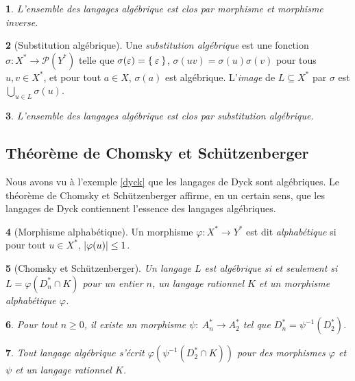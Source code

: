 \documentclass[11pt,a4paper]{article}
\theoremstyle{plain}
\newtheorem{thm}{\protect\theoremname}
\theoremstyle{definition}
\newtheorem{defn}[thm]{\protect\definitionname}
\theoremstyle{definition}
\theoremstyle{remark}
\theoremstyle{remark}
\theoremstyle{plain}
\newtheorem{lem}[thm]{\protect\lemmaname}
\theoremstyle{plain}
\newtheorem{prop}[thm]{\protect\propositionname}
\theoremstyle{plain}
\newtheorem{cor}[thm]{\protect\corollaryname}
\theoremstyle{remark}
\providecommand{\corollaryname}{Corollaire}
\providecommand{\definitionname}{Définition}
\providecommand{\lemmaname}{Lemme}
\providecommand{\propositionname}{Proposition}
\providecommand{\theoremname}{Théorème}
\begin{document}
\begin{prop}
	L'ensemble des langages algébrique est clos par morphisme et morphisme inverse.
\end{prop}

\begin{defn}[Substitution algébrique]
	Une \emph{substitution algébrique} est une fonction $\sigma:X^*\to \mathcal{P}(Y^*)$ telle que $\sigma(\varepsilon)=\Set{\varepsilon}$, $\sigma(uv)=\sigma(u)\sigma(v)$ pour tous $u,v\in X ^*$, et pour tout $a\in X$, $\sigma(a)$ est algébrique. L'\emph{image} de $L\subseteq X^*$ par $\sigma$ est $\underset{u\in L}{\bigcup}\sigma(u)$.
\end{defn}

\begin{prop}
	L'ensemble des langages algébrique est clos par substitution algébrique.
\end{prop}

\subsection{Théorème de Chomsky et Schützenberger} %

Nous avons vu à l'exemple \ref{dyck} que les langages de Dyck sont algébriques. Le théorème de Chomsky et Schützenberger affirme, en un certain sens, que les langages de Dyck contiennent l'essence des langages algébriques.

\begin{defn}[Morphisme alphabétique]
	Un morphisme $\varphi:X^*\to Y^*$ est dit \emph{alphabétique} si pour tout $u\in X^*$, $\left|\varphi(u)\right| \le 1$.
\end{defn}

\begin{thm}[Chomsky et Schützenberger]
	Un langage $L$ est algébrique si et seulement si $L=\varphi(D^*_n\cap K)$ pour un entier $n$, un langage rationnel $K$ et un morphisme alphabétique $\varphi$.
\end{thm}

\begin{lem}
	Pour tout $n \ge 0$, il existe un morphisme $\psi:\ A_{n}^{*}\to A_{2}^{*}$ tel que $D_{n}^{*}=\psi^{-1}\left(D_{2}^{*}\right)$.
\end{lem}

\begin{cor}
	Tout langage algébrique s'écrit $\varphi\left(\psi^{-1}\left(D_{2}^{*}\cap K\right)\right)$
	pour des morphismes $\varphi$ et $\psi$ et un langage rationnel
	$K$.
\end{cor}
\end{document}
